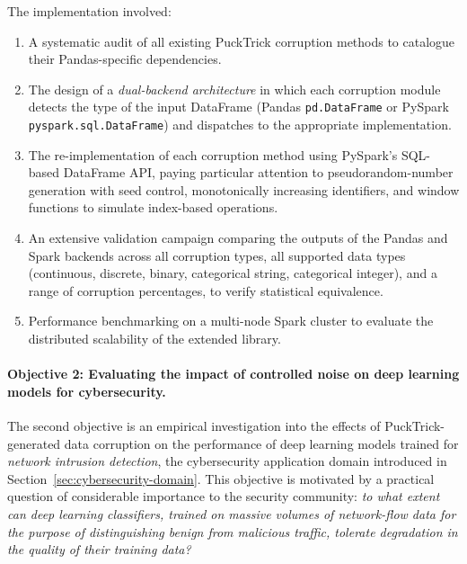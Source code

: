 The implementation involved:
\begin{enumerate}
    \item A systematic audit of all existing PuckTrick corruption methods to
          catalogue their Pandas-specific dependencies.
    \item The design of a \emph{dual-backend architecture} in which each
          corruption module detects the type of the input DataFrame (Pandas
          \texttt{pd.DataFrame} or PySpark \texttt{pyspark.sql.DataFrame})
          and dispatches to the appropriate implementation.
    \item The re-implementation of each corruption method using PySpark's
          SQL-based DataFrame API, paying particular attention to
          pseudorandom-number generation with seed control, monotonically
          increasing identifiers, and window functions to simulate
          index-based operations.
    \item An extensive validation campaign comparing the outputs of the Pandas
          and Spark backends across all corruption types, all supported data
          types (continuous, discrete, binary, categorical string,
          categorical integer), and a range of corruption percentages, to
          verify statistical equivalence.
    \item Performance benchmarking on a multi-node Spark cluster to evaluate
          the distributed scalability of the extended library.
\end{enumerate}

\paragraph{Objective 2: Evaluating the impact of controlled noise on deep
learning models for cybersecurity.}
The second objective is an empirical investigation into the effects of
PuckTrick-generated data corruption on the performance of deep learning models
trained for \emph{network intrusion detection}, the cybersecurity application
domain introduced in Section~\ref{sec:cybersecurity-domain}.  This objective
is motivated by a practical question of considerable importance to the security
community: \emph{to what extent can deep learning classifiers, trained on
massive volumes of network-flow data for the purpose of distinguishing benign
from malicious traffic, tolerate degradation in the quality of their training
data?}

